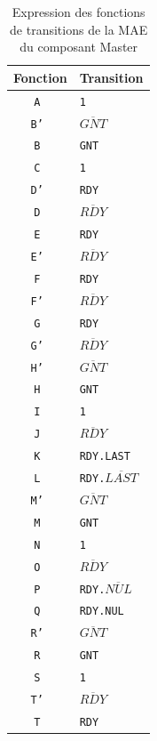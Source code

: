 \documentclass{article}
\begin{document}
\begin{table}[H]
\centering
\begingroup
\setlength{\tabcolsep}{5pt}
\renewcommand{\arraystretch}{1.1}
\begin{tabular}{ | c | l | }
\hline
Fonction    &   Transition  \\
\hline
\tt{A}  & \tt{1} \\
\tt{B'} & \tt{$\overline{GNT}$} \\
\tt{B}  & \tt{GNT} \\
\hline
\tt{C}  & \tt{1} \\
\tt{D'} & \tt{RDY} \\
\tt{D}  & \tt{$\overline{RDY}$} \\
\tt{E}  & \tt{RDY} \\
\tt{E'} & \tt{$\overline{RDY}$} \\
\tt{F}  & \tt{RDY} \\
\tt{F'} & \tt{$\overline{RDY}$} \\
\tt{G}  & \tt{RDY} \\
\tt{G'} & \tt{$\overline{RDY}$} \\
\hline
\tt{H'} & \tt{$\overline{GNT}$} \\
\tt{H}  & \tt{GNT} \\
\tt{I}  & \tt{1} \\
\tt{J}  & \tt{$\overline{RDY}$} \\
\tt{K}  & \tt{RDY.LAST} \\
\tt{L}  & \tt{RDY.$\overline{LAST}$} \\
\hline
\tt{M'} & \tt{$\overline{GNT}$} \\
\tt{M}  & \tt{GNT} \\
\tt{N}  & \tt{1} \\
\tt{O}  & \tt{$\overline{RDY}$} \\
\tt{P}  & \tt{RDY.$\overline{NUL}$} \\
\tt{Q}  & \tt{RDY.NUL} \\
\hline
\tt{R'} & \tt{$\overline{GNT}$} \\
\tt{R}  & \tt{GNT} \\
\tt{S}  & \tt{1} \\
\tt{T'} & \tt{$\overline{RDY}$} \\
\tt{T}  & \tt{RDY} \\
\hline
\end{tabular}
\endgroup
\caption{Expression des fonctions de transitions de la MAE du composant Master}
\label{standard}
\end{table}
\end{document}
